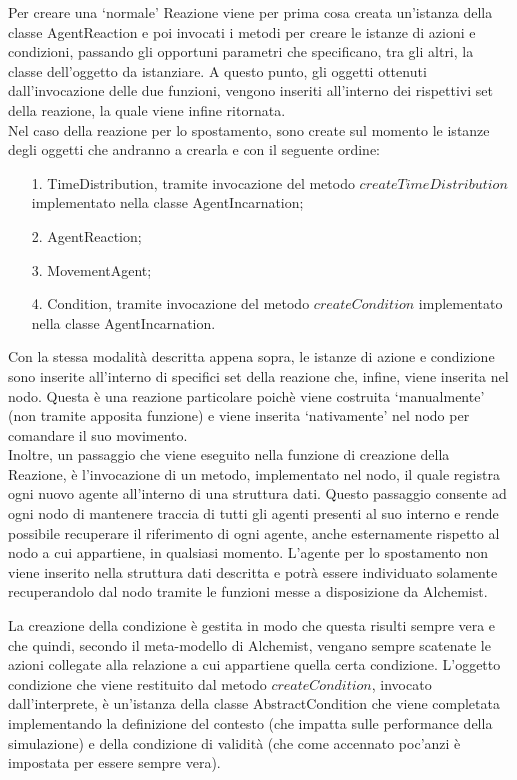 Per creare una `normale' Reazione viene per prima cosa creata un'istanza della classe AgentReaction e poi invocati i metodi per creare le istanze di azioni e condizioni, passando gli opportuni parametri che specificano, tra gli altri, la classe dell'oggetto da istanziare. A questo punto, gli oggetti ottenuti dall'invocazione delle due funzioni, vengono inseriti all'interno dei rispettivi set della reazione, la quale viene infine ritornata.
\\
Nel caso della reazione per lo spostamento, sono create sul momento le istanze degli oggetti che andranno a crearla e con il seguente ordine:
\begin{itemize}
\item[1.] TimeDistribution, tramite invocazione del metodo $createTimeDistribution$ implementato nella classe AgentIncarnation;
\item[2.] AgentReaction;
\item[3.] MovementAgent;
\item[4.] Condition, tramite invocazione del metodo $createCondition$ implementato nella classe AgentIncarnation.
\end{itemize}
Con la stessa modalità descritta appena sopra, le istanze di azione e condizione sono inserite all'interno di specifici set della reazione che, infine, viene inserita nel nodo. Questa è una reazione particolare poichè viene costruita `manualmente' (non tramite apposita funzione) e viene inserita `nativamente' nel nodo per comandare il suo movimento.
\\
Inoltre, un passaggio che viene eseguito nella funzione di creazione della Reazione, è l'invocazione di un metodo, implementato nel nodo, il quale registra ogni nuovo agente all'interno di una struttura dati. Questo passaggio consente ad ogni nodo di mantenere traccia di tutti gli agenti presenti al suo interno e rende possibile recuperare il riferimento di ogni agente, anche esternamente rispetto al nodo a cui appartiene, in qualsiasi momento.
L'agente per lo spostamento non viene inserito nella struttura dati descritta e potrà essere individuato solamente recuperandolo dal nodo tramite le funzioni messe a disposizione da Alchemist.

La creazione della condizione è gestita in modo che questa risulti sempre vera e che quindi, secondo il meta-modello di Alchemist, vengano sempre scatenate le azioni collegate alla relazione a cui appartiene quella certa condizione. L'oggetto condizione che viene restituito dal metodo $createCondition$, invocato dall'interprete, è un'istanza della classe AbstractCondition che viene completata implementando la definizione del contesto (che impatta sulle performance della simulazione) e della condizione di validità (che come accennato poc'anzi è impostata per essere sempre vera).

